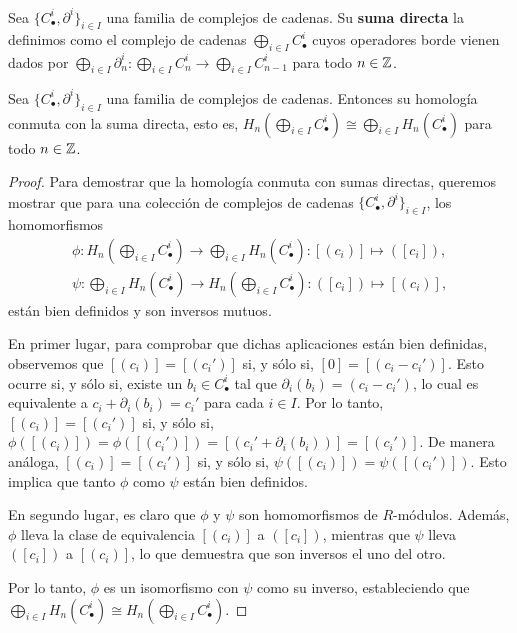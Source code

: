 \begin{definicion}
	Sea \(\{C_{\bullet}^{i}, \partial^{i}\}_{i \in I}\) una familia de complejos de cadenas.
	Su \textbf{suma directa} la definimos como el complejo de cadenas \(\bigoplus_{i
	\in I}C^{i}_{\bullet}\) cuyos operadores borde vienen dados por \(\bigoplus_{i
	\in I}{\partial}^{i}_{n} : \bigoplus_{i \in I}C^{i}_{n} \to \bigoplus_{i \in I}
	C^{i}_{n-1}\) para todo \(n \in \mathbb{Z}\).
\end{definicion}
\begin{proposicion}
	\label{prop:hom-free-commute} Sea \(\{C_{\bullet}^{i}, \partial^{i}\}_{i \in I}\)
	una familia de complejos de cadenas. Entonces su homología conmuta con la suma
	directa, esto es,
	\(H_{n}(\bigoplus_{i \in I}C_{\bullet}^{i}) \cong \bigoplus_{i \in I}H_{n}(C_{\bullet}
	^{i})\)
	para todo \(n \in \mathbb{Z}\).
\end{proposicion}
\begin{proof}
	Para demostrar que la homología conmuta con sumas directas, queremos mostrar
	que para una colección de complejos de cadenas
	\(\{C_{\bullet}^{i}, \partial^{i}\}_{i \in I}\), los homomorfismos
	\begin{align*}
		\phi: H_{n} \left( \bigoplus_{i \in I}C_{\bullet}^{i} \right) \rightarrow \bigoplus_{i \in I}H_{n} (C_{\bullet}^{i}) : [(c_{i})] \mapsto ([c_{i}]), \\
		\psi: \bigoplus_{i \in I}H_{n} (C_{\bullet}^{i}) \rightarrow H_{n} \left( \bigoplus_{i \in I}C_{\bullet}^{i} \right) : ([c_{i}]) \mapsto [(c_{i})],
	\end{align*}
	están bien definidos y son inversos mutuos.

	En primer lugar, para comprobar que dichas aplicaciones están bien definidas, observemos
	que \([(c_{i})] = [(c_{i}')]\) si, y sólo si, \([0] = [(c_{i} - c_{i}')]\). Esto
	ocurre si, y sólo si, existe un \(b_{i} \in C_{\bullet}^{i}\) tal que
	\(\partial_{i}(b_{i}) = (c_{i} - c_{i}')\), lo cual es equivalente a \(c_{i} + \partial
	_{i}(b_{i}) = c_{i}'\) para cada \(i \in I\). Por lo tanto, \([(c_{i})] = [(c_{i}')
	]\) si, y sólo si, \(\phi([(c_{i})]) = \phi([(c_{i}')]) = [(c_{i}' + \partial_{i}
	(b_{i}))] = [(c_{i}')]\). De manera análoga, \([(c_{i})] = [(c_{i}')]\) si, y
	sólo si, \(\psi([(c_{i})]) = \psi([(c_{i}')])\). Esto implica que tanto \(\phi\)
	como \(\psi\) están bien definidos.

	En segundo lugar, es claro que \(\phi\) y \(\psi\) son homomorfismos de \(R\)-módulos.
	Además, \(\phi\) lleva la clase de equivalencia \([(c_{i})]\) a \(([c_{i}])\),
	mientras que \(\psi\) lleva \(([c_{i}])\) a \([(c_{i})]\), lo que demuestra que son inversos
	el uno del otro.

	Por lo tanto, \(\phi\) es un isomorfismo con \(\psi\) como su inverso, estableciendo
	que \(\bigoplus_{i \in I}H_{n} (C_{\bullet}^{i}) \cong H_{n} \left( \bigoplus_{i
	\in I}C_{\bullet}^{i} \right)\).
\end{proof}
